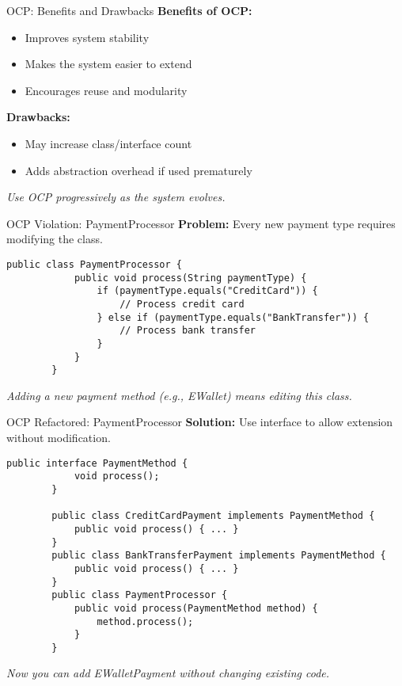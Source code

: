 \documentclass[aspectratio=169, table]{beamer}
\begin{document}
\begin{frame}[fragile]{OCP: Benefits and Drawbacks}
	\vspace{20pt}
	\textbf{Benefits of OCP:}
	\begin{itemize}
		\item Improves system stability
		\item Makes the system easier to extend
		\item Encourages reuse and modularity
	\end{itemize}
	
	\textbf{Drawbacks:}
	\begin{itemize}
		\item May increase class/interface count
		\item Adds abstraction overhead if used prematurely
	\end{itemize}
	
	\textit{Use OCP progressively as the system evolves.}
\end{frame}

\begin{frame}[fragile]{OCP Violation: PaymentProcessor}
	\vspace{20pt}
	\textbf{Problem:} Every new payment type requires modifying the class.
	\begin{lstlisting}[style=JavaStyle]
		public class PaymentProcessor {
			public void process(String paymentType) {
				if (paymentType.equals("CreditCard")) {
					// Process credit card
				} else if (paymentType.equals("BankTransfer")) {
					// Process bank transfer
				}
			}
		}
	\end{lstlisting}
	\textit{Adding a new payment method (e.g., EWallet) means editing this class.}
\end{frame}

\begin{frame}[fragile]{OCP Refactored: PaymentProcessor}
	\vspace{20pt}
	\textbf{Solution:} Use interface to allow extension without modification.
	\begin{lstlisting}[style=JavaStyle]
		public interface PaymentMethod {
			void process();
		}

		public class CreditCardPayment implements PaymentMethod {
			public void process() { ... }
		}
		public class BankTransferPayment implements PaymentMethod {
			public void process() { ... }
		}
		public class PaymentProcessor {
			public void process(PaymentMethod method) {
				method.process();
			}
		}
	\end{lstlisting}
	\textit{Now you can add EWalletPayment without changing existing code.}
\end{frame}
\end{document}
